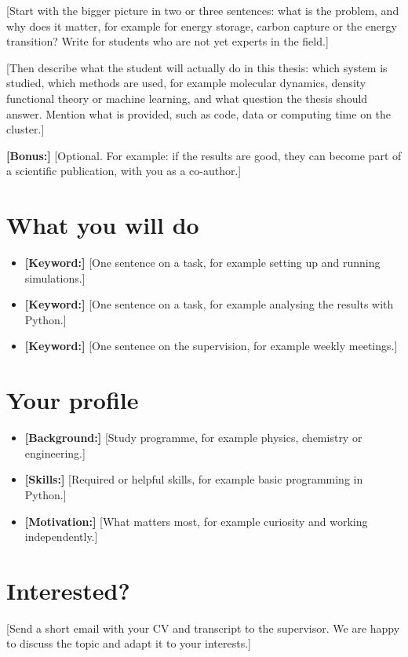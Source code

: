 \documentclass{corelab-thesis}
\begin{document}
\makeflyerhead

\begin{topic}

[Start with the bigger picture in two or three sentences: what is the problem, and why does
it matter, for example for energy storage, carbon capture or the energy transition? Write for
students who are not yet experts in the field.]

[Then describe what the student will actually do in this thesis: which system is studied, which
methods are used, for example molecular dynamics, density functional theory or machine learning,
and what question the thesis should answer. Mention what is provided, such as code, data or
computing time on the cluster.]

\begin{highlight}
\textbf{[Bonus:]} [Optional. For example: if the results are good, they can become part of a
scientific publication, with you as a co-author.]
\end{highlight}

\section*{What you will do}
\begin{itemize}
  \item \textbf{[Keyword:]} [One sentence on a task, for example setting up and running simulations.]
  \item \textbf{[Keyword:]} [One sentence on a task, for example analysing the results with Python.]
  \item \textbf{[Keyword:]} [One sentence on the supervision, for example weekly meetings.]
\end{itemize}

\section*{Your profile}
\begin{itemize}
  \item \textbf{[Background:]} [Study programme, for example physics, chemistry or engineering.]
  \item \textbf{[Skills:]} [Required or helpful skills, for example basic programming in Python.]
  \item \textbf{[Motivation:]} [What matters most, for example curiosity and working independently.]
\end{itemize}

\section*{Interested?}
[Send a short email with your CV and transcript to the supervisor. We are happy to discuss the
topic and adapt it to your interests.]


\end{topic}
\end{document}
